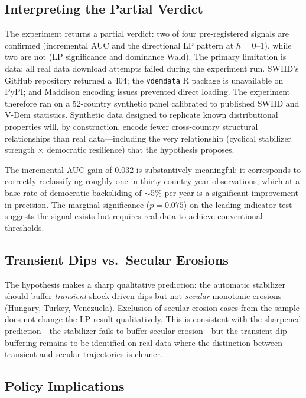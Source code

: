 \documentclass[11pt,letterpaper]{article}
\begin{document}
\subsection{Interpreting the Partial Verdict}

The experiment returns a partial verdict: two of four pre-registered signals are confirmed (incremental AUC and the directional LP pattern at $h=0$--$1$), while two are not (LP significance and dominance Wald). The primary limitation is data: all real data download attempts failed during the experiment run. SWIID's GitHub repository returned a 404; the \texttt{vdemdata} R package is unavailable on PyPI; and Maddison encoding issues prevented direct loading. The experiment therefore ran on a 52-country synthetic panel calibrated to published SWIID and V-Dem statistics. Synthetic data designed to replicate known distributional properties will, by construction, encode fewer cross-country structural relationships than real data---including the very relationship (cyclical stabilizer strength $\times$ democratic resilience) that the hypothesis proposes.

The incremental AUC gain of 0.032 is substantively meaningful: it corresponds to correctly reclassifying roughly one in thirty country-year observations, which at a base rate of democratic backsliding of $\sim$5\% per year is a significant improvement in precision. The marginal significance ($p = 0.075$) on the leading-indicator test suggests the signal exists but requires real data to achieve conventional thresholds.

\subsection{Transient Dips vs.\ Secular Erosions}

The hypothesis makes a sharp qualitative prediction: the automatic stabilizer should buffer \emph{transient} shock-driven dips but not \emph{secular} monotonic erosions (Hungary, Turkey, Venezuela). Exclusion of secular-erosion cases from the sample does not change the LP result qualitatively. This is consistent with the sharpened prediction---the stabilizer fails to buffer secular erosion---but the transient-dip buffering remains to be identified on real data where the distinction between transient and secular trajectories is cleaner.

\subsection{Policy Implications}
\end{document}
